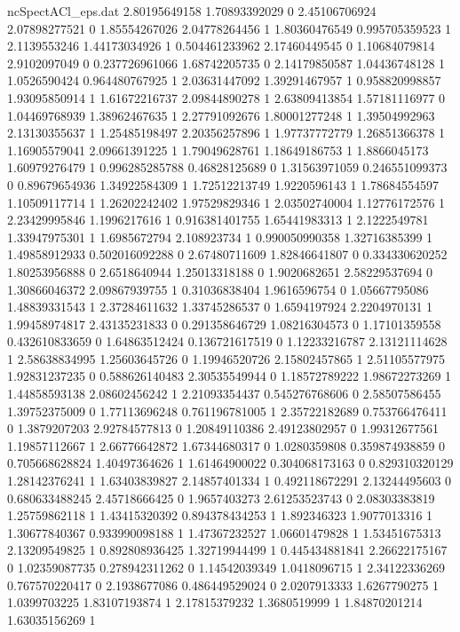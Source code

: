 \begin{filecontents}{ncSpectACl_eps.dat}
2.80195649158 1.70893392029 0
2.45106706924 2.07898277521 0
1.85554267026 2.04778264456 1
1.80360476549 0.995705359523 1
2.1139553246 1.44173034926 1
0.504461233962 2.17460449545 0
1.10684079814 2.9102097049 0
0.237726961066 1.68742205735 0
2.14179850587 1.04436748128 1
1.0526590424 0.964480767925 1
2.03631447092 1.39291467957 1
0.958820998857 1.93095850914 1
1.61672216737 2.09844890278 1
2.63809413854 1.57181116977 0
1.04469768939 1.38962467635 1
2.27791092676 1.80001277248 1
1.39504992963 2.13130355637 1
1.25485198497 2.20356257896 1
1.97737772779 1.26851366378 1
1.16905579041 2.09661391225 1
1.79049628761 1.18649186753 1
1.8866045173 1.60979276479 1
0.996285285788 0.46828125689 0
1.31563971059 0.246551099373 0
0.89679654936 1.34922584309 1
1.72512213749 1.9220596143 1
1.78684554597 1.10509117714 1
1.26202242402 1.97529829346 1
2.03502740004 1.12776172576 1
2.23429995846 1.1996217616 1
0.916381401755 1.65441983313 1
2.1222549781 1.33947975301 1
1.6985672794 2.108923734 1
0.990050990358 1.32716385399 1
1.49858912933 0.502016092288 0
2.67480711609 1.82846641807 0
0.334330620252 1.80253956888 0
2.6518640944 1.25013318188 0
1.9020682651 2.58229537694 0
1.30866046372 2.09867939755 1
0.31036838404 1.9616596754 0
1.05667795086 1.48839331543 1
2.37284611632 1.33745286537 0
1.6594197924 2.2204970131 1
1.99458974817 2.43135231833 0
0.291358646729 1.08216304573 0
1.17101359558 0.432610833659 0
1.64863512424 0.136721617519 0
1.12233216787 2.13121114628 1
2.58638834995 1.25603645726 0
1.19946520726 2.15802457865 1
2.51105577975 1.92831237235 0
0.588626140483 2.30535549944 0
1.18572789222 1.98672273269 1
1.44858593138 2.08602456242 1
2.21093354437 0.545276768606 0
2.58507586455 1.39752375009 0
1.77113696248 0.761196781005 1
2.35722182689 0.753766476411 0
1.3879207203 2.92784577813 0
1.20849110386 2.49123802957 0
1.99312677561 1.19857112667 1
2.66776642872 1.67344680317 0
1.0280359808 0.359874938859 0
0.705668628824 1.40497364626 1
1.61464900022 0.304068173163 0
0.829310320129 1.28142376241 1
1.63403839827 2.14857401334 1
0.492118672291 2.13244495603 0
0.680633488245 2.45718666425 0
1.9657403273 2.61253523743 0
2.08303383819 1.25759862118 1
1.43415320392 0.894378434253 1
1.892346323 1.9077013316 1
1.30677840367 0.933990098188 1
1.47367232527 1.06601479828 1
1.53451675313 2.13209549825 1
0.892808936425 1.32719944499 1
0.445434881841 2.26622175167 0
1.02359087735 0.278942311262 0
1.14542039349 1.0418096715 1
2.34122336269 0.767570220417 0
2.1938677086 0.486449529024 0
2.0207913333 1.6267790275 1
1.0399703225 1.83107193874 1
2.17815379232 1.3680519999 1
1.84870201214 1.63035156269 1

\end{filecontents}
